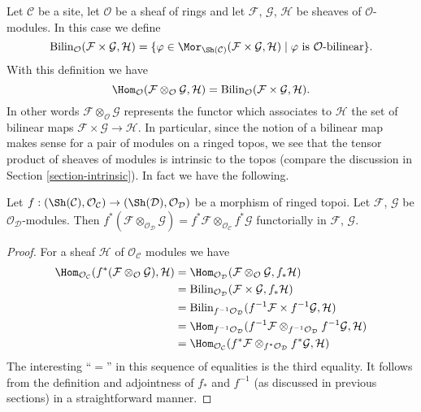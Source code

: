 \medskip\noindent
Let $\mathcal{C}$ be a site, let $\mathcal{O}$ be a sheaf of rings and let
$\mathcal{F}$, $\mathcal{G}$, $\mathcal{H}$ be sheaves of
$\mathcal{O}$-modules. In this case we define
$$
\text{Bilin}_\mathcal{O}(\mathcal{F} \times \mathcal{G}, \mathcal{H})
=
\{\varphi \in
\Mor_{\Sh(\mathcal{C})}(
\mathcal{F} \times \mathcal{G}, \mathcal{H}) \mid
\varphi \text{ is }\mathcal{O}\text{-bilinear}\}.
$$
With this definition we have
$$
\Hom_\mathcal{O}
(\mathcal{F} \otimes_\mathcal{O} \mathcal{G}, \mathcal{H})
=
\text{Bilin}_\mathcal{O}(\mathcal{F} \times \mathcal{G}, \mathcal{H}).
$$
In other words $\mathcal{F} \otimes_\mathcal{O} \mathcal{G}$
represents the functor which associates to $\mathcal{H}$ the set
of bilinear maps $\mathcal{F} \times \mathcal{G} \to \mathcal{H}$.
In particular, since the notion of a bilinear map makes sense for
a pair of modules on a ringed topos, we see that the tensor
product of sheaves of modules is intrinsic to the topos (compare
the discussion in Section \ref{section-intrinsic}). In fact we
have the following.

\begin{lemma}
\label{lemma-tensor-product-pullback}
Let $f : (\Sh(\mathcal{C}), \mathcal{O}_\mathcal{C})
\to (\Sh(\mathcal{D}), \mathcal{O}_\mathcal{D})$ be
a morphism of ringed topoi. Let $\mathcal{F}$, $\mathcal{G}$
be $\mathcal{O}_\mathcal{D}$-modules. Then
$f^*(\mathcal{F} \otimes_{\mathcal{O}_\mathcal{D}} \mathcal{G})
= f^*\mathcal{F} \otimes_{\mathcal{O}_\mathcal{C}} f^*\mathcal{G}$
functorially in $\mathcal{F}$, $\mathcal{G}$.
\end{lemma}

\begin{proof}
For a sheaf $\mathcal{H}$ of $\mathcal{O}_\mathcal{C}$ modules we
have
\begin{align*}
\Hom_{\mathcal{O}_\mathcal{C}}(
f^*(\mathcal{F} \otimes_\mathcal{O} \mathcal{G}), \mathcal{H})
& =
\Hom_{\mathcal{O}_\mathcal{D}}(
\mathcal{F} \otimes_\mathcal{O} \mathcal{G}, f_*\mathcal{H}) \\
& =
\text{Bilin}_{\mathcal{O}_\mathcal{D}}(
\mathcal{F} \times \mathcal{G}, f_*\mathcal{H}) \\
& =
\text{Bilin}_{f^{-1}\mathcal{O}_\mathcal{D}}(
f^{-1}\mathcal{F} \times f^{-1}\mathcal{G}, \mathcal{H}) \\
& =
\Hom_{f^{-1}\mathcal{O}_\mathcal{D}}(
f^{-1}\mathcal{F} \otimes_{f^{-1}\mathcal{O}_\mathcal{D}} f^{-1}\mathcal{G},
\mathcal{H}) \\
& =
\Hom_{\mathcal{O}_\mathcal{C}}(
f^*\mathcal{F} \otimes_{f^*\mathcal{O}_\mathcal{D}} f^*\mathcal{G},
\mathcal{H})
\end{align*}
The interesting ``$=$'' in this sequence of equalities is the
third equality. It follows from the definition and adjointness of
$f_*$ and $f^{-1}$ (as discussed in previous sections) in a
straightforward manner.
\end{proof}

